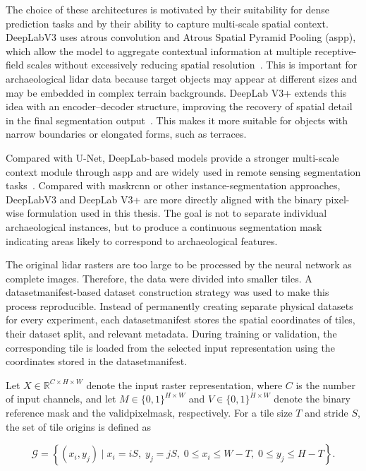 The choice of these architectures is motivated by their suitability for dense prediction tasks and by their ability to capture multi-scale spatial context. DeepLabV3 uses atrous convolution and Atrous Spatial Pyramid Pooling (\gls{aspp}), which allow the model to aggregate contextual information at multiple receptive-field scales without excessively reducing spatial resolution~\cite{chen_rethinking_2017}. This is important for archaeological \gls{lidar} data because target objects may appear at different sizes and may be embedded in complex terrain backgrounds. DeepLab V3+ extends this idea with an encoder--decoder structure, improving the recovery of spatial detail in the final segmentation output~\cite{chen_encoder-decoder_2018}. This makes it more suitable for objects with narrow boundaries or elongated forms, such as terraces.

Compared with U-Net, DeepLab-based models provide a stronger multi-scale context module through \gls{aspp} and are widely used in remote sensing segmentation tasks~\cite{quan_improved_2021,zhou_dynamic_2023,chen_rethinking_2017}. Compared with \gls{maskrcnn} or other instance-segmentation approaches, DeepLabV3 and DeepLab V3+ are more directly aligned with the binary pixel-wise formulation used in this thesis. The goal is not to separate individual archaeological instances, but to produce a continuous segmentation mask indicating areas likely to correspond to archaeological features.

The original \gls{lidar} rasters are too large to be processed by the neural network as complete images. Therefore, the data were divided into smaller tiles. A \gls{datasetmanifest}-based dataset construction strategy was used to make this process reproducible. Instead of permanently creating separate physical datasets for every experiment, each \gls{datasetmanifest} stores the spatial coordinates of tiles, their dataset split, and relevant metadata. During training or validation, the corresponding tile is loaded from the selected input representation using the coordinates stored in the \gls{datasetmanifest}.

Let \(X \in \mathbb{R}^{C \times H \times W}\) denote the input raster representation, where \(C\) is the number of input channels, and let \(M \in \{0,1\}^{H \times W}\) and \(V \in \{0,1\}^{H \times W}\) denote the binary reference mask and the \gls{validpixelmask}, respectively. For a tile size \(T\) and stride \(S\), the set of tile origins is defined as

\begin{equation}
\mathcal{G} =
\left\{
(x_i,y_j) \mid
x_i = iS,\;
y_j = jS,\;
0 \leq x_i \leq W-T,\;
0 \leq y_j \leq H-T
\right\}.
\label{eq:tile_origins}
\end{equation}

